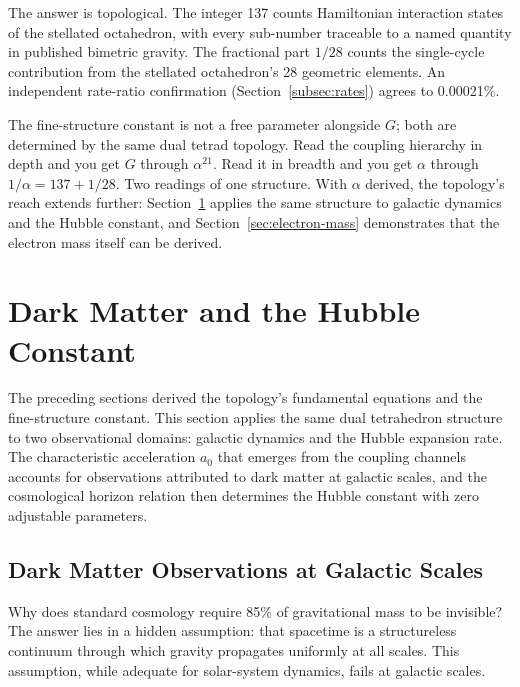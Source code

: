 \documentclass[aps,prd,preprint,superscriptaddress,showpacs,preprintnumbers,amsmath,amssymb,nofootinbib]{revtex4-2}
\begin{document}
The answer is topological. The integer 137 counts Hamiltonian interaction states of the stellated octahedron, with every sub-number traceable to a named quantity in published bimetric gravity. The fractional part $1/28$ counts the single-cycle contribution from the stellated octahedron's 28 geometric elements. An independent rate-ratio confirmation (Section~\ref{subsec:rates}) agrees to 0.00021\%.

The fine-structure constant is not a free parameter alongside $G$; both are determined by the same dual tetrad topology. Read the coupling hierarchy in depth and you get $G$ through $\alpha^{21}$. Read it in breadth and you get $\alpha$ through $1/\alpha = 137 + 1/28$. Two readings of one structure. With $\alpha$ derived, the topology's reach extends further: Section~\ref{sec:darkmatter} applies the same structure to galactic dynamics and the Hubble constant, and Section~\ref{sec:electron-mass} demonstrates that the electron mass itself can be derived.

\section{Dark Matter and the Hubble Constant}
\label{sec:darkmatter}

The preceding sections derived the topology's fundamental equations and the fine-structure constant. This section applies the same dual tetrahedron structure to two observational domains: galactic dynamics and the Hubble expansion rate. The characteristic acceleration $a_0$ that emerges from the coupling channels accounts for observations attributed to dark matter at galactic scales, and the cosmological horizon relation then determines the Hubble constant with zero adjustable parameters.

\subsection{Dark Matter Observations at Galactic Scales}
\label{subsec:darkmatter}

Why does standard cosmology require 85\% of gravitational mass to be invisible? The answer lies in a hidden assumption: that spacetime is a structureless continuum through which gravity propagates uniformly at all scales. This assumption, while adequate for solar-system dynamics, fails at galactic scales.
\end{document}
